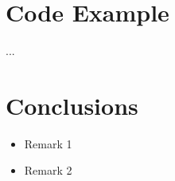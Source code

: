 \documentclass[a0,portrait]{a0poster}\usepackage[]{graphicx}\usepackage[]{color}
\newcommand{\mysec}[1]{\color{Black}\section*{#1}\color{DarkSlateGray}}
\begin{document}
\begin{multicols}{2}
\begin{multicols}{2}[\setlength{\columnseprule}{0pt}]
\end{multicols}




\mysec{Code Example}

\begin{multicols}{2}[\setlength{\columnseprule}{0pt}]



\columnbreak

...

\end{multicols}



\mysec{Conclusions}
\color{NavyBlue}

\begin{itemize}
  \item Remark 1
  \item Remark 2
\end{itemize}

\color{DarkSlateGray} %


\nocite{*} %

\end{multicols}

\end{document}
